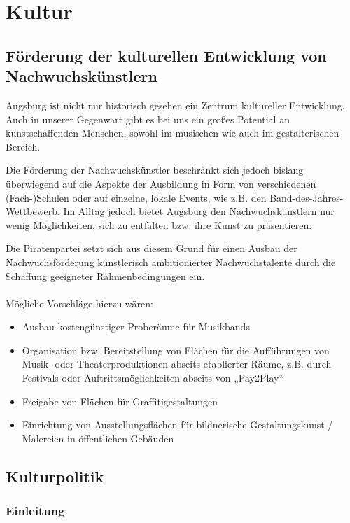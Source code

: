\chapter{Kultur}
  
  \section{Förderung der kulturellen Entwicklung von Nachwuchskünstlern}
  Augsburg ist nicht nur historisch gesehen ein Zentrum kultureller 
  Entwicklung. Auch in unserer Gegenwart gibt es bei uns ein großes Potential 
  an kunstschaffenden Menschen, sowohl im musischen wie auch im 
  gestalterischen Bereich.
  
  Die Förderung der Nachwuchskünstler beschränkt sich jedoch bislang 
  überwiegend auf die Aspekte der Ausbildung in Form von verschiedenen 
  (Fach-)Schulen oder auf einzelne, lokale Events, wie z.B. den 
  Band-des-Jahres-Wettbewerb. Im Alltag jedoch bietet Augsburg den 
  Nachwuchskünstlern nur wenig Möglichkeiten, sich zu entfalten bzw. ihre 
  Kunst zu präsentieren.
  
  Die Piratenpartei setzt sich aus diesem Grund für einen Ausbau der 
  Nachwuchsförderung künstlerisch ambitionierter Nachwuchstalente durch die 
  Schaffung geeigneter Rahmenbedingungen ein.\\
  \\
  Mögliche Vorschläge hierzu wären:
  
  \begin{itemize}
  \item Ausbau kostengünstiger Proberäume für Musikbands
  \item Organisation bzw. Bereitstellung von Flächen für die Aufführungen
        von Musik- oder Theaterproduktionen abseits etablierter Räume, z.B. 
        durch Festivals oder Auftrittsmöglichkeiten abseits von „Pay2Play“
  \item Freigabe von Flächen für Graffitigestaltungen
  \item Einrichtung von Ausstellungsflächen für bildnerische 
        Gestaltungskunst / Malereien in öffentlichen Gebäuden 
  \end{itemize}
  
  \section{Kulturpolitik}
  \subsection{Einleitung}
  
